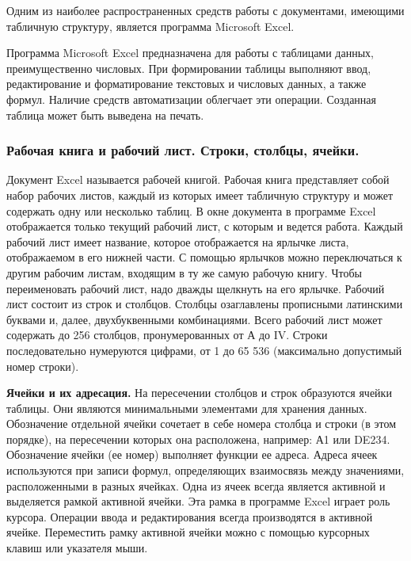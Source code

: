 \documentclass[a4paper]{article}
\begin{document}
Одним из наиболее распространенных средств работы с документами, имеющими табличную структуру, является программа Microsoft Excel.

Программа Microsoft Excel предназначена для работы с таблицами данных, преимущественно числовых. При формировании таблицы выполняют ввод, редактирование и форматирование текстовых и числовых данных, а также формул. Наличие средств автоматизации облегчает эти операции. Созданная таблица может быть выведена на печать.

\subsubsection{Рабочая книга и рабочий лист. Строки, столбцы, ячейки.}

Документ Excel называется рабочей книгой. Рабочая книга представляет собой набор рабочих листов, каждый из которых имеет табличную структуру и может содержать одну или несколько таблиц. В окне документа в программе Excel отображается только текущий рабочий лист, с которым и ведется работа. Каждый рабочий лист имеет название, которое отображается на ярлычке листа, отображаемом в его нижней части. С помощью ярлычков можно переключаться к другим рабочим листам, входящим в ту же самую рабочую книгу. Чтобы переименовать рабочий лист, надо дважды щелкнуть на его ярлычке. Рабочий лист состоит из строк и столбцов. Столбцы озаглавлены прописными латинскими буквами и, далее, двухбуквенными комбинациями. Всего рабочий лист может содержать до 256 столбцов, пронумерованных от А до IV. Строки последовательно нумеруются цифрами, от 1 до 65 536 (максимально допустимый номер строки).

\textbf{Ячейки и их адресация.} На пересечении столбцов и строк образуются ячейки таблицы. Они являются минимальными элементами для хранения данных. Обозначение отдельной ячейки сочетает в себе номера столбца и строки (в этом порядке), на пересечении которых она расположена, например: А1 или DE234. Обозначение ячейки (ее номер) выполняет функции ее адреса. Адреса ячеек используются при записи формул, определяющих взаимосвязь между значениями, расположенными в разных ячейках. Одна из ячеек всегда является активной и выделяется рамкой активной ячейки. Эта рамка в программе Excel играет роль курсора. Операции ввода и редактирования всегда производятся в активной ячейке. Переместить рамку активной ячейки можно с помощью курсорных клавиш или указателя мыши.
\end{document}
